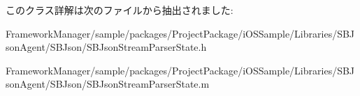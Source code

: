 このクラス詳解は次のファイルから抽出されました\+:\begin{DoxyCompactItemize}
\item 
Framework\+Manager/sample/packages/\+Project\+Package/i\+O\+S\+Sample/\+Libraries/\+S\+B\+Json\+Agent/\+S\+B\+Json/S\+B\+Json\+Stream\+Parser\+State.\+h\item 
Framework\+Manager/sample/packages/\+Project\+Package/i\+O\+S\+Sample/\+Libraries/\+S\+B\+Json\+Agent/\+S\+B\+Json/S\+B\+Json\+Stream\+Parser\+State.\+m\end{DoxyCompactItemize}
